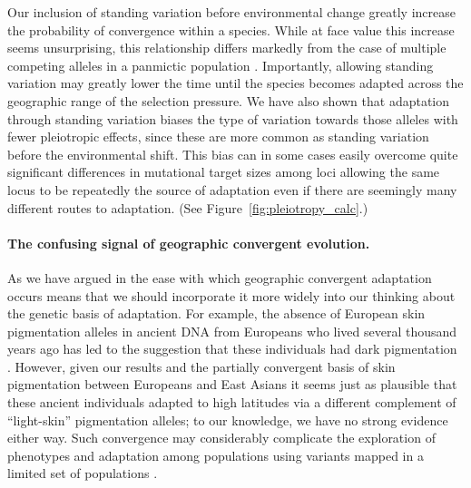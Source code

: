 \documentclass{article}
\begin{document}
Our inclusion of standing variation 
before environmental change greatly increase the probability of
convergence within a species.
While at face value this increase seems unsurprising,
this relationship differs markedly from the case of multiple competing
alleles in a panmictic population \citep[see discussion above and in ][]{softsweepsI,softsweepsII}. 
Importantly, allowing standing variation may greatly lower the time until the species becomes adapted 
across the geographic range of the selection pressure. We have also
shown that adaptation through standing variation biases the type of variation towards those alleles 
with fewer pleiotropic effects, since these are more common as standing variation before the environmental shift. 
This bias can in some cases easily overcome quite significant differences in mutational target sizes
among loci allowing the same locus to be repeatedly the source of
adaptation even if there are seemingly many different routes to adaptation.
(See Figure~\ref{fig:pleiotropy_calc}.)

\paragraph{The confusing signal of geographic convergent evolution.}
As we have argued in \citet{ralphcoop2010} the ease with which
geographic convergent adaptation occurs means that we should
incorporate it more widely into our thinking about the genetic basis
of adaptation. For example, the absence of European skin pigmentation alleles in
ancient DNA from Europeans who lived several thousand years ago
has led to the suggestion that these individuals had dark
pigmentation \citep{olalde2014derived,lazaridis2013ancient, Wilde2014}. 
However, given our results and the partially convergent
basis of skin pigmentation between Europeans and East Asians
\citep{norton-human-pigmentation,edwards2010pigmentation} it seems just as plausible that these ancient individuals
adapted to high latitudes via a different complement of ``light-skin'' pigmentation alleles;
to our knowledge, we have no strong evidence either way.
Such convergence may considerably complicate the 
exploration of phenotypes and adaptation among populations using variants mapped in a
limited set of populations \citep{Berg:14}.
\end{document}
